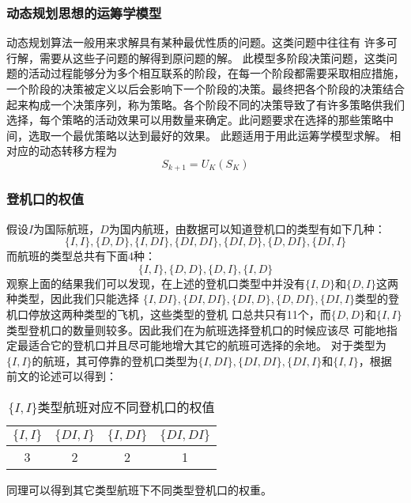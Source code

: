 \documentclass[bwprint]{gmcmthesis}
\begin{document}
\subsubsection{动态规划思想的运筹学模型}
动态规划算法一般用来求解具有某种最优性质的问题。这类问题中往往有
许多可行解，需要从这些子问题的解得到原问题的解。
此模型多阶段决策问题，这类问题的活动过程能够分为多个相互联系的阶段，在每一个阶段都需要采取相应措施，一个阶段的决策被定义以后会影响下一个阶段的决策。最终把各个阶段的决策结合起来构成一个决策序列，称为策略。各个阶段不同的决策导致了有许多策略供我们选择，每个策略的活动效果可以用数量来确定。此问题要求在选择的那些策略中间，选取一个最优策略以达到最好的效果。 此题适用于用此运筹学模型求解。
相对应的动态转移方程为
\begin{equation}
S_{k+1}=U_{K}\left ( S_{K} \right )
\end{equation}

\subsubsection{登机口的权值}
假设$I$为国际航班，$D$为国内航班，由数据可以知道登机口的类型有如下几种：
\begin{equation}
    \{I,I\},\{D,D\},\{I,DI\},\{DI,DI\},\{DI,D\},\{D,DI\},\{DI,I\}
\end{equation}
而航班的类型总共有下面4种：
\begin{equation}
    \{I,I\},\{D,D\},\{D,I\},\{I,D\}
\end{equation}
观察上面的结果我们可以发现，在上述的登机口类型中并没有$\{I,D\}$和$\{D,I\}$这两种类型，因此我们只能选择
$\{I,DI\},\{DI,DI\},\{DI,D\},\{D,DI\},\{DI,I\}$类型的登机口停放这两种类型的飞机，这些类型的登机
口总共只有11个，而$\{D,D\}$和$\{I,I\}$类型登机口的数量则较多。因此我们在为航班选择登机口的时候应该尽
可能地指定最适合它的登机口并且尽可能地增大其它的航班可选择的余地。
对于类型为$\{I,I\}$的航班，其可停靠的登机口类型为$\{I,DI\},\{DI,DI\},\{DI,I\}$和$\{I,I\}$，根据
前文的论述可以得到：
\begin{table*}[!hbp]
\centering
\caption{$\{I, I\}$类型航班对应不同登机口的权值}
\begin{tabular}{|c|c|c|c|}
    \hline  
    $\{I, I\}$ & $\{DI, I\}$ & $\{I, DI\}$ & $\{DI, DI\}$\\
    \hline 
    3&2&2&1\\
    \hline 
\end{tabular}
\end{table*}

同理可以得到其它类型航班下不同类型登机口的权重。
\end{document}
